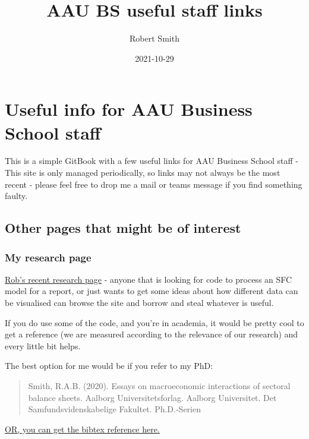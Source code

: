 \documentclass[
]{book}
\title{AAU BS useful staff links}
\author{Robert Smith}
\date{2021-10-29}
\begin{document}
\maketitle

{
\setcounter{tocdepth}{1}
\tableofcontents
}
\hypertarget{useful-info-for-aau-business-school-staff}{%
\chapter{Useful info for AAU Business School staff}\label{useful-info-for-aau-business-school-staff}}

This is a simple GitBook with a few useful links for AAU Business School staff - This site is only managed periodically, so links may not always be the most recent - please feel free to drop me a mail or teams message if you find something faulty.

\hypertarget{other-pages-that-might-be-of-interest}{%
\section{Other pages that might be of interest}\label{other-pages-that-might-be-of-interest}}

\hypertarget{my-research-page}{%
\subsection{My research page}\label{my-research-page}}

\href{https://robabsmith.github.io/research_page/}{Rob's recent research page} - anyone that is looking for code to process an SFC model for a report, or just wants to get some ideas about how different data can be visualised can browse the site and borrow and steal whatever is useful.

If you do use some of the code, and you're in academia, it would be pretty cool to get a reference (we are measured according to the relevance of our research) and every little bit helps.

The best option for me would be if you refer to my PhD:

\begin{quote}
Smith, R.A.B. (2020). Essays on macroeconomic interactions of sectoral balance sheets. Aalborg Universitetsforlag. Aalborg Universitet. Det Samfundsvidenskabelige Fakultet. Ph.D.-Serien
\end{quote}

\href{https://vbn.aau.dk/en/publications/essays-on-macroeconomic-interactions-of-sectoral-balance-sheets}{OR, you can get the bibtex reference here.}
\end{document}
